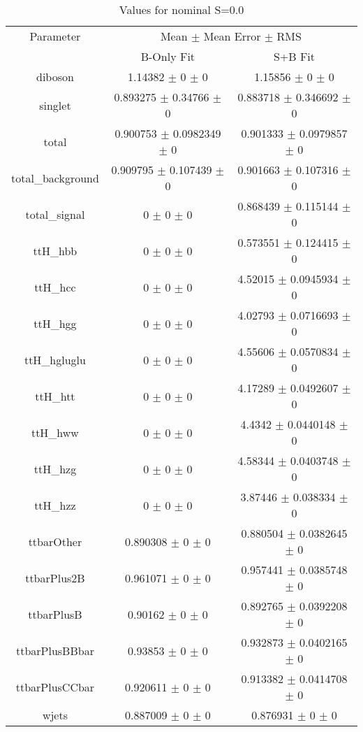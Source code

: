 \begin{table}
\centering
\caption{Values for nominal S=0.0}
\begin{tabular}{ccc}
\toprule
Parameter & \multicolumn{2}{c}{Mean $\pm$ Mean Error $\pm$ RMS}\\
 & B-Only Fit & S+B Fit\\
\midrule
diboson & \num{1.14382} $\pm$ \num{0} $\pm$ \num{0} & \num{1.15856} $\pm$ \num{0} $\pm$ \num{0}\\
singlet & \num{0.893275} $\pm$ \num{0.34766} $\pm$ \num{0} & \num{0.883718} $\pm$ \num{0.346692} $\pm$ \num{0}\\
total & \num{0.900753} $\pm$ \num{0.0982349} $\pm$ \num{0} & \num{0.901333} $\pm$ \num{0.0979857} $\pm$ \num{0}\\
total\_background & \num{0.909795} $\pm$ \num{0.107439} $\pm$ \num{0} & \num{0.901663} $\pm$ \num{0.107316} $\pm$ \num{0}\\
total\_signal & \num{0} $\pm$ \num{0} $\pm$ \num{0} & \num{0.868439} $\pm$ \num{0.115144} $\pm$ \num{0}\\
ttH\_hbb & \num{0} $\pm$ \num{0} $\pm$ \num{0} & \num{0.573551} $\pm$ \num{0.124415} $\pm$ \num{0}\\
ttH\_hcc & \num{0} $\pm$ \num{0} $\pm$ \num{0} & \num{4.52015} $\pm$ \num{0.0945934} $\pm$ \num{0}\\
ttH\_hgg & \num{0} $\pm$ \num{0} $\pm$ \num{0} & \num{4.02793} $\pm$ \num{0.0716693} $\pm$ \num{0}\\
ttH\_hgluglu & \num{0} $\pm$ \num{0} $\pm$ \num{0} & \num{4.55606} $\pm$ \num{0.0570834} $\pm$ \num{0}\\
ttH\_htt & \num{0} $\pm$ \num{0} $\pm$ \num{0} & \num{4.17289} $\pm$ \num{0.0492607} $\pm$ \num{0}\\
ttH\_hww & \num{0} $\pm$ \num{0} $\pm$ \num{0} & \num{4.4342} $\pm$ \num{0.0440148} $\pm$ \num{0}\\
ttH\_hzg & \num{0} $\pm$ \num{0} $\pm$ \num{0} & \num{4.58344} $\pm$ \num{0.0403748} $\pm$ \num{0}\\
ttH\_hzz & \num{0} $\pm$ \num{0} $\pm$ \num{0} & \num{3.87446} $\pm$ \num{0.038334} $\pm$ \num{0}\\
ttbarOther & \num{0.890308} $\pm$ \num{0} $\pm$ \num{0} & \num{0.880504} $\pm$ \num{0.0382645} $\pm$ \num{0}\\
ttbarPlus2B & \num{0.961071} $\pm$ \num{0} $\pm$ \num{0} & \num{0.957441} $\pm$ \num{0.0385748} $\pm$ \num{0}\\
ttbarPlusB & \num{0.90162} $\pm$ \num{0} $\pm$ \num{0} & \num{0.892765} $\pm$ \num{0.0392208} $\pm$ \num{0}\\
ttbarPlusBBbar & \num{0.93853} $\pm$ \num{0} $\pm$ \num{0} & \num{0.932873} $\pm$ \num{0.0402165} $\pm$ \num{0}\\
ttbarPlusCCbar & \num{0.920611} $\pm$ \num{0} $\pm$ \num{0} & \num{0.913382} $\pm$ \num{0.0414708} $\pm$ \num{0}\\
wjets & \num{0.887009} $\pm$ \num{0} $\pm$ \num{0} & \num{0.876931} $\pm$ \num{0} $\pm$ \num{0}\\
\bottomrule
\end{tabular}
\end{table}